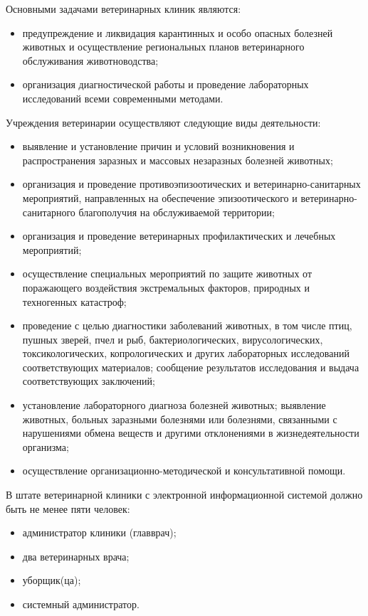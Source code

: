 \documentclass[a4paper,14pt]{article}
\begin{document}
Основными задачами ветеринарных клиник являются:

\begin{itemize}
	\item предупреждение и ликвидация карантинных и особо опасных болезней животных и осуществление региональных планов ветеринарного обслуживания животноводства;
	\item  организация диагностической работы и проведение лабораторных исследований всеми современными методами.
\end{itemize}

Учреждения ветеринарии осуществляют следующие виды деятельности:

\begin{itemize}
	\item выявление и установление причин и условий возникновения и распространения заразных и массовых незаразных болезней животных;
	\item организация и проведение противоэпизоотических и ветеринарно-санитарных мероприятий, направленных на обеспечение эпизоотического и ветеринарно-санитарного благополучия на обслуживаемой территории;
	\item организация и проведение ветеринарных профилактических и лечебных мероприятий;
	\item осуществление специальных мероприятий по защите животных от поражающего воздействия экстремальных факторов, природных и техногенных катастроф;
	\item проведение с целью диагностики заболеваний животных, в том числе птиц, пушных зверей, пчел и рыб, бактериологических, вирусологических, токсикологических, копрологических и других лабораторных исследований соответствующих материалов; сообщение результатов исследования и выдача соответствующих заключений;
	\item установление лабораторного диагноза болезней животных; выявление животных, больных заразными болезнями или болезнями, связанными с нарушениями обмена веществ и другими отклонениями в жизнедеятельности организма;
	\item осуществление организационно-методической и консультативной помощи.
\end{itemize}

В штате ветеринарной клиники с электронной информационной системой должно быть не менее пяти человек:

\begin{itemize}
	\item администратор клиники (главврач);
	\item два ветеринарных врача;
	\item уборщик(ца);
	\item системный администратор.
\end{itemize}
\end{document}
